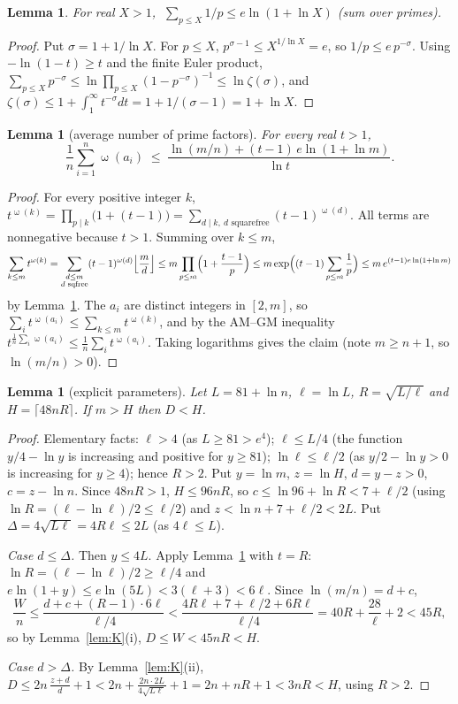 \documentclass[11pt]{article}
\newtheorem{lemma}[theorem]{Lemma}
\theoremstyle{definition}
\DeclareMathOperator{\om}{\omega}
\begin{document}
\begin{lemma}\label{lem:primesum}
For real $X>1$, $\;\sum_{p\le X}1/p\le e\ln(1+\ln X)$ (sum over primes).
\end{lemma}
\begin{proof}
Put $\sigma=1+1/\ln X$. For $p\le X$, $p^{\sigma-1}\le X^{1/\ln X}=e$, so $1/p\le e\,p^{-\sigma}$. Using
$-\ln(1-t)\ge t$ and the finite Euler product,
$\sum_{p\le X}p^{-\sigma}\le\ln\prod_{p\le X}(1-p^{-\sigma})^{-1}\le\ln\zeta(\sigma)$, and
$\zeta(\sigma)\le 1+\int_1^\infty t^{-\sigma}dt=1+1/(\sigma-1)=1+\ln X$.
\end{proof}

\begin{lemma}[average number of prime factors]\label{lem:omega}
For every real $t>1$,
\[
 \frac1n\sum_{i=1}^n\om(a_i)\;\le\;\frac{\ln(m/n)+(t-1)\,e\ln(1+\ln m)}{\ln t}.
\]
\end{lemma}
\begin{proof}
For every positive integer $k$, $t^{\om(k)}=\prod_{p\mid k}\bigl(1+(t-1)\bigr)=\sum_{d\mid k,\ d\text{ squarefree}}(t-1)^{\om(d)}$.
All terms are nonnegative because $t>1$. Summing over $k\le m$,
\[
 \sum_{k\le m}t^{\om(k)}=\sum_{\substack{d\le m\\ d\text{ sqfree}}}(t-1)^{\om(d)}\Bigl\lfloor\frac md\Bigr\rfloor
 \le m\prod_{p\le m}\Bigl(1+\frac{t-1}p\Bigr)\le m\exp\Bigl((t-1)\sum_{p\le m}\frac1p\Bigr)
 \le m\,e^{(t-1)e\ln(1+\ln m)}
\]
by Lemma~\ref{lem:primesum}. The $a_i$ are distinct integers in $[2,m]$, so
$\sum_i t^{\om(a_i)}\le\sum_{k\le m}t^{\om(k)}$, and by the AM--GM inequality
$t^{\frac1n\sum_i\om(a_i)}\le\frac1n\sum_i t^{\om(a_i)}$. Taking logarithms gives the claim (note $m\ge n+1$, so $\ln(m/n)>0$).
\end{proof}

\begin{lemma}[explicit parameters]\label{lem:explicit}
Let $L=81+\ln n$, $\ell=\ln L$, $R=\sqrt{L/\ell}$ and $H=\lceil 48nR\rceil$. If $m>H$ then $D<H$.
\end{lemma}
\begin{proof}
Elementary facts: $\ell>4$ (as $L\ge 81>e^4$); $\ell\le L/4$ (the function $y/4-\ln y$ is increasing and
positive for $y\ge 81$); $\ln\ell\le\ell/2$ (as $y/2-\ln y>0$ is increasing for $y\ge 4$); hence
$R>2$. Put $y=\ln m$, $z=\ln H$, $d=y-z>0$, $c=z-\ln n$. Since $48nR>1$, $H\le 96nR$, so
$c\le\ln 96+\ln R<7+\ell/2$ (using $\ln R=(\ell-\ln\ell)/2\le\ell/2$) and $z<\ln n+7+\ell/2<2L$. Put
$\Delta=4\sqrt{L\ell}=4R\ell\le 2L$ (as $4\ell\le L$).

\emph{Case $d\le\Delta$.} Then $y\le 4L$. Apply Lemma~\ref{lem:omega} with $t=R$: $\ln R=(\ell-\ln\ell)/2\ge\ell/4$
and $e\ln(1+y)\le e\ln(5L)<3(\ell+3)<6\ell$. Since $\ln(m/n)=d+c$,
\[
 \frac Wn\le\frac{d+c+(R-1)\cdot 6\ell}{\ell/4}<\frac{4R\ell+7+\ell/2+6R\ell}{\ell/4}=40R+\frac{28}{\ell}+2<45R,
\]
so by Lemma~\ref{lem:K}(i), $D\le W<45nR<H$.

\emph{Case $d>\Delta$.} By Lemma~\ref{lem:K}(ii),
$D\le 2n\,\frac{z+d}{d}+1<2n+\frac{2n\cdot 2L}{4\sqrt{L\ell}}+1=2n+nR+1<3nR<H$, using $R>2$.
\end{proof}
\end{document}

